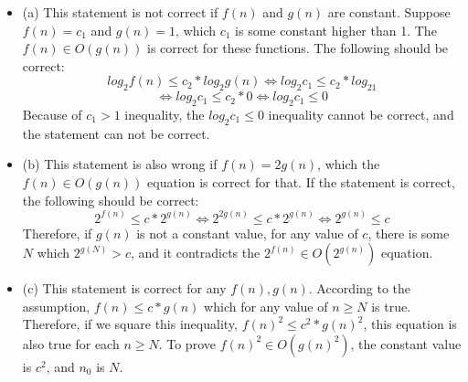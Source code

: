\documentclass[12pt]{article}
\newenvironment{solution}[2][Solution]{\begin{trivlist}
\item[\hskip \labelsep {\bfseries #1}]}{\end{trivlist}}
\begin{document}
\begin{solution}{}
\begin{itemize}
\item (a) This statement is not correct if $f(n)$ and $g(n)$ are constant.
Suppose $f(n)=c_1$ and $g(n)=1$, which $c_1$ is some constant higher than 1.
The $f(n) \in O(g(n))$ is correct for these functions.
The following should be correct:
$$log_2f(n) \leq c_2*log_2g(n) \Leftrightarrow log_2c_1 \leq c_2*log_21$$
$$\Leftrightarrow log_2c_1 \leq c_2*0 \Leftrightarrow log_2c_1 \leq 0$$
Because of $c_1 > 1$ inequality,  the $log_2c_1 \leq 0$ inequality cannot be correct,
and the statement can not be correct.

\item (b) This statement is also wrong if $f(n) = 2g(n)$, which the $f(n) \in O(g(n))$ equation
is correct for that.
If the statement is correct, the following should be correct:
$$2^{f(n)} \leq c*2^{g(n)} \Leftrightarrow 2^{2g(n)} \leq c*2^{g(n)} \Leftrightarrow 2^{g(n)} \leq c$$
Therefore, if $g(n)$ is not a constant value, for any value of $c$, there is some $N$ which
$2^{g(N)} > c$, and it contradicts the $2^{f(n)} \in O(2^{g(n)})$ equation.

\item (c) This statement is correct for any $f(n), g(n)$.
According to the assumption, $f(n) \leq c * g(n)$ which for any value of $n \geq N$ is true.
Therefore, if we square this inequality, $f(n)^2 \leq c^2 * g(n)^2$, this equation is also true
for each $n \geq N$. To prove $f(n)^2 \in O(g(n)^2)$, the constant value is $c^2$, and $n_0$ is $N$.

\end{itemize}
\end{solution}


\pagebreak
\end{document}
